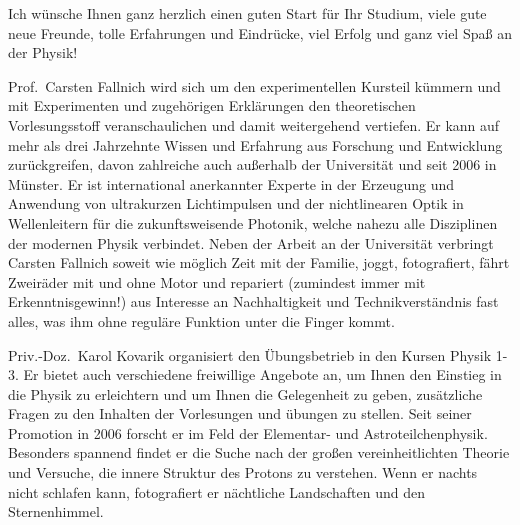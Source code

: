 \begin{multicols}{2}
Ich wünsche Ihnen ganz herzlich einen guten Start für Ihr Studium, viele gute neue Freunde, tolle Erfahrungen und Eindrücke, viel Erfolg und ganz viel Spaß an der Physik!




Prof.\ Carsten Fallnich wird sich um den experimentellen Kursteil kümmern und mit Experimenten und zugehörigen Erklärungen den theoretischen Vorlesungsstoff veranschaulichen und damit weitergehend vertiefen. Er kann auf mehr als drei Jahrzehnte Wissen und Erfahrung aus Forschung und Entwicklung zurückgreifen, davon zahlreiche auch außerhalb der Universität und seit 2006 in Münster. Er ist international anerkannter Experte in der Erzeugung und Anwendung von ultrakurzen Lichtimpulsen und der nichtlinearen Optik in Wellenleitern für die zukunftsweisende Photonik, welche nahezu alle Disziplinen der modernen Physik verbindet. Neben der Arbeit an der Universität verbringt Carsten Fallnich soweit wie möglich Zeit mit der Familie, joggt, fotografiert, fährt Zweiräder mit und ohne Motor und repariert (zumindest immer mit Erkenntnisgewinn!) aus Interesse an Nachhaltigkeit und Technikverständnis fast alles, was ihm ohne reguläre Funktion unter die Finger kommt.

Priv.-Doz.~Karol Kovarik organisiert den Übungsbetrieb in den Kursen Physik 1-3. Er bietet auch verschiedene freiwillige Angebote an, um Ihnen den Einstieg in die Physik zu erleichtern und um Ihnen die Gelegenheit zu geben, zusätzliche Fragen zu den Inhalten der Vorlesungen und übungen zu stellen. Seit seiner Promotion in 2006 forscht er im Feld der Elementar- und Astroteilchenphysik. Besonders spannend findet er die Suche nach der großen vereinheitlichten Theorie und Versuche, die innere Struktur des Protons zu verstehen. Wenn er nachts nicht schlafen kann, fotografiert er nächtliche Landschaften und den Sternenhimmel.


\end{multicols}

